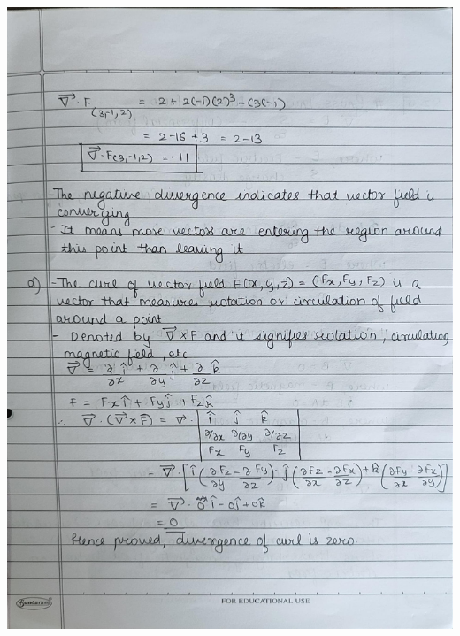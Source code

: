 \documentclass{exam}
\begin{document}
\newpage
\begin{center}
	\includegraphics[scale=0.23]{3.jpeg} 
\end{center}

\vspace{0.5cm}


\vspace{0.1cm}
\noindent

	
\end{document}
